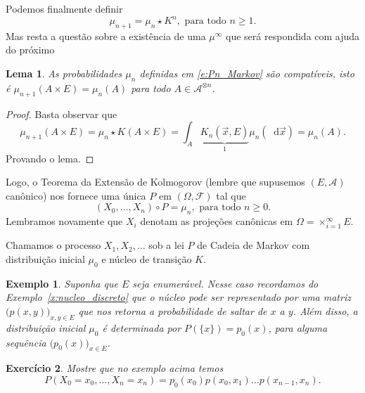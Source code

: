 \documentclass[reqno]{article}
\newcommand*\1{\mathds{1}}
\newtheorem{lemma}[theorem]{Lema}
\newtheorem{example}{Exemplo}[section]
\newtheorem{exercise}[example]{Exercício}
\renewcommand*\d{\mathop{}\!\mathrm{d}}
\begin{document}
Podemos finalmente definir
\begin{equation}
  \label{e:Pn_Markov}
  \mu_{n+1} = \mu_n \star K^n, \text{ para todo $n \geq 1$}.
\end{equation}
Mas resta a questão sobre a existência de uma $\mu^\infty$ que será respondida com ajuda do próximo

\begin{lemma}
  As probabilidades $\mu_n$ definidas em \eqref{e:Pn_Markov} são compatíveis, isto é $\mu_{n+1}(A \times E) = \mu_n(A)$ para todo $A \in \mathcal{A}^{\otimes n}$.
\end{lemma}

\begin{proof}
  Basta observar que
  \begin{equation}
    \mu_{n+1}(A \times E) = \mu_n \star K (A \times E) = \int_{A} \underbrace{K_n (\vec{x}, E)}_1 \mu_n(\d \vec{x}) = \mu_n(A).
  \end{equation}
  Provando o lema.
\end{proof}

Logo, o Teorema da Extensão de Kolmogorov (lembre que supusemos $(E, \mathcal{A})$ canônico) nos fornece uma única $P$ em $(\Omega, \mathcal{F})$ tal que
\begin{equation}
  (X_0, \dots, X_n) \circ P = \mu_n, \text{ para todo $n \geq 0$}.
\end{equation}
Lembramos novamente que $X_i$ denotam as projeções canônicas em $\Omega = \times_{i=1}^\infty E$.

Chamamos o processo $X_1, X_2, \dots$ sob a lei $P$ de Cadeia de Markov com distribuição inicial $\mu_0$ e núcleo de transição $K$.

\begin{example}
  Suponha que $E$ seja enumerável.
  Nesse caso recordamos do Exemplo~\ref{x:nucleo_discreto} que o núcleo pode ser representado por uma matriz $\big(p(x,y)\big)_{x,y \in E}$ que nos retorna a probabilidade de saltar de $x$ a $y$.
  Além disso, a distribuição inicial $\mu_0$ é determinada por $P(\{x\}) = p_0(x)$, para alguma sequência $\big(p_0(x)\big)_{x \in E}$.
\end{example}

\begin{exercise}
  Mostre que no exemplo acima temos
  \begin{equation}
    P(X_0 = x_0, \dots, X_n = x_n) = p_0(x_0) p(x_0, x_1) \dots p(x_{n-1}, x_n).
  \end{equation}
\end{exercise}
\end{document}
